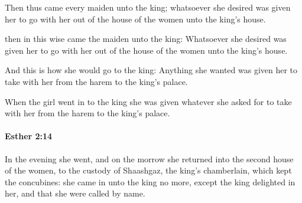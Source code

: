 			Then thus came every maiden unto the king; whatsoever she desired was given her to go with her out of the house of the women unto the king’s house.

			\begin{versebox}
					\item[BHS] 
					\item[LXX] 
					\item[ASV] then in this wise came the maiden unto the king: Whatsoever she desired was given her to go with her out of the house of the women unto the king's house.
					\item[NIV] And this is how she would go to the king: Anything she wanted was given her to take with her from the harem to the king’s palace.
					\item[NRSV] When the girl went in to the king she was given whatever she asked for to take with her from the harem to the king’s palace.
			\end{versebox}

		\paragraph{Esther 2:14} %
			\label{ESTHER-2-14}

			In the evening she went, and on the morrow she returned into the second house of the women, to the custody of Shaashgaz, the king’s chamberlain, which kept the concubines: she came in unto the king no more, except the king delighted in her, and that she were called by name.

